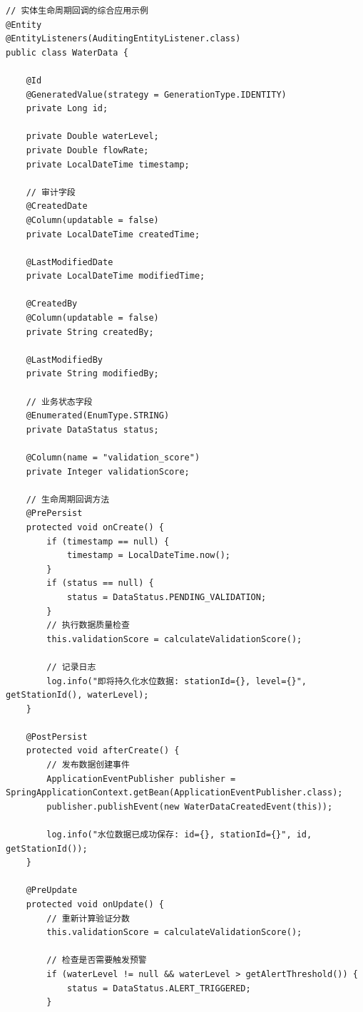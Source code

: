 \begin{lstlisting}[style=java]
// 实体生命周期回调的综合应用示例
@Entity
@EntityListeners(AuditingEntityListener.class)
public class WaterData {
    
    @Id
    @GeneratedValue(strategy = GenerationType.IDENTITY)
    private Long id;
    
    private Double waterLevel;
    private Double flowRate;
    private LocalDateTime timestamp;
    
    // 审计字段
    @CreatedDate
    @Column(updatable = false)
    private LocalDateTime createdTime;
    
    @LastModifiedDate
    private LocalDateTime modifiedTime;
    
    @CreatedBy
    @Column(updatable = false)
    private String createdBy;
    
    @LastModifiedBy
    private String modifiedBy;
    
    // 业务状态字段
    @Enumerated(EnumType.STRING)
    private DataStatus status;
    
    @Column(name = "validation_score")
    private Integer validationScore;
    
    // 生命周期回调方法
    @PrePersist
    protected void onCreate() {
        if (timestamp == null) {
            timestamp = LocalDateTime.now();
        }
        if (status == null) {
            status = DataStatus.PENDING_VALIDATION;
        }
        // 执行数据质量检查
        this.validationScore = calculateValidationScore();
        
        // 记录日志
        log.info("即将持久化水位数据: stationId={}, level={}", getStationId(), waterLevel);
    }
    
    @PostPersist
    protected void afterCreate() {
        // 发布数据创建事件
        ApplicationEventPublisher publisher = SpringApplicationContext.getBean(ApplicationEventPublisher.class);
        publisher.publishEvent(new WaterDataCreatedEvent(this));
        
        log.info("水位数据已成功保存: id={}, stationId={}", id, getStationId());
    }
    
    @PreUpdate
    protected void onUpdate() {
        // 重新计算验证分数
        this.validationScore = calculateValidationScore();
        
        // 检查是否需要触发预警
        if (waterLevel != null && waterLevel > getAlertThreshold()) {
            status = DataStatus.ALERT_TRIGGERED;
        }
        

\end{lstlisting}
